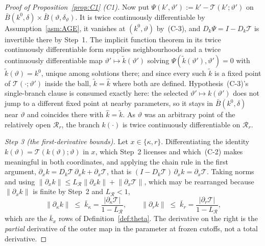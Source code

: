 \documentclass[11pt]{article}
\newcommand{\Tmap}{\mathcal{T}}
\begin{document}
\begin{proof}[Proof of Proposition~\ref{prop:C1} (C1)]
Now put $\Psi(k',\vartheta') := k' - \Tmap(k';\vartheta')$ on
$\bar B(k^0,\delta)\times\bar B(\vartheta,\delta_\vartheta)$. It is twice continuously differentiable by
Assumption~\ref{asm:AGE}, it vanishes at $(k^0,\vartheta)$ by~(C-3), and
$D_k\Psi = I - D_k\Tmap$ is invertible there by Step~1. The implicit function theorem in its twice
continuously differentiable form supplies neighbourhoods and a twice continuously differentiable map
$\vartheta'\mapsto\tilde k(\vartheta')$ solving $\Psi(\tilde k(\vartheta'),\vartheta') = 0$ with
$\tilde k(\vartheta) = k^0$, unique among solutions there; and since every such $\tilde k$ is a
fixed point of $\Tmap(\cdot;\vartheta')$ inside the ball, $\tilde k = \hat k$ where both are
defined. Hypothesis~(C-3)'s single-branch clause is consumed exactly here: the selected
$\vartheta'\mapsto k(\vartheta')$ does not jump to a different fixed point at nearby parameters, so
it stays in $\bar B(k^0,\delta)$ near $\vartheta$ and coincides there with $\hat k = \tilde k$. As
$\vartheta$ was an arbitrary point of the relatively open $\mathcal R_r$, the branch $k(\cdot)$ is
twice continuously differentiable on $\mathcal R_r$.

\emph{Step 3 (the first-derivative bounds).} Let $x\in\{\kappa,r\}$. Differentiating the identity
$k(\vartheta) = \Tmap(k(\vartheta);\vartheta)$ in $x$, which Step~2 licenses and which~(C-2) makes
meaningful in both coordinates, and applying the chain rule in the first argument,
$\partial_x k = D_k\Tmap\,\partial_x k + \partial_x\Tmap$, that is
$(I-D_k\Tmap)\,\partial_x k = \partial_x\Tmap$. Taking norms and using
$\lVert\partial_x k\rVert \le L_{\mathcal R}\lVert\partial_x k\rVert + \lVert\partial_x\Tmap\rVert$,
which may be rearranged because $\lVert\partial_x k\rVert$ is finite by Step~2 and
$L_{\mathcal R} < 1$,
\begin{equation}
\label{eq:C1-kbar}
\lVert\partial_\kappa k\rVert \;\le\; \bar k_\kappa = \frac{\lvert\partial_\kappa\Tmap\rvert}{1-L_{\mathcal R}},
\qquad
\lVert\partial_r k\rVert \;\le\; \bar k_r = \frac{\lvert\partial_r\Tmap\rvert}{1-L_{\mathcal R}},
\end{equation}
which are the $\bar k_x$ rows of Definition~\ref{def:theta}. The derivative on the right is the
\emph{partial} derivative of the outer map in the parameter at frozen cutoffs, not a total
derivative.


\end{proof}
\end{document}
